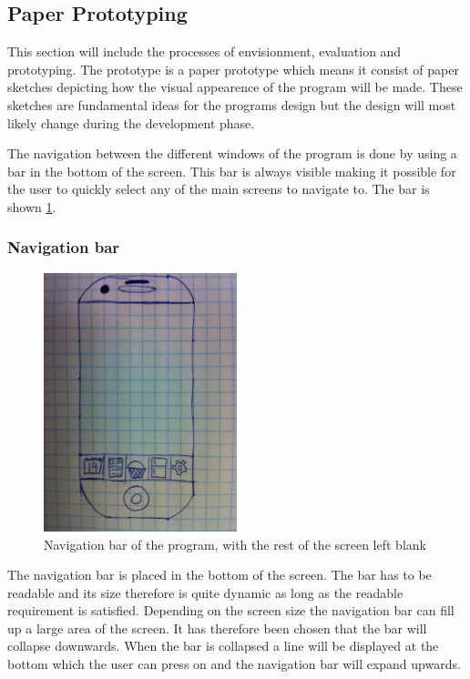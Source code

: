 \subsection{Paper Prototyping}\label{Sketches}
This section will include the processes of envisionment, evaluation and prototyping. The prototype is a paper prototype which means it consist of paper sketches depicting how the visual appearence of the program will be made. These sketches are fundamental ideas for the programs design but the design will most likely change during the development phase.

The navigation between the different windows of the program is done by using a bar in the bottom of the screen. This bar is always visible making it possible for the user to quickly select any of the main screens to navigate to. The bar is shown \cref{NavigationBarSketch}.

\subsubsection{Navigation bar}

\begin{figure}[H]
	\centering
    \includegraphics[width=0.5\textwidth]{Grafik/FoodPlanner/NavigationBarSketch}
	\caption{Navigation bar of the program, with the rest of the screen left blank}
	\label{NavigationBarSketch}
\end{figure}

The navigation bar is placed in the bottom of the screen. The bar has to be readable and its size therefore is quite dynamic as long as the readable requirement is satisfied. Depending on the screen size the navigation bar can fill up a large area of the screen. It has therefore been chosen that the bar will collapse downwards. When the bar is collapsed a line will be displayed at the bottom which the user can press on and the navigation bar will expand upwards.   

